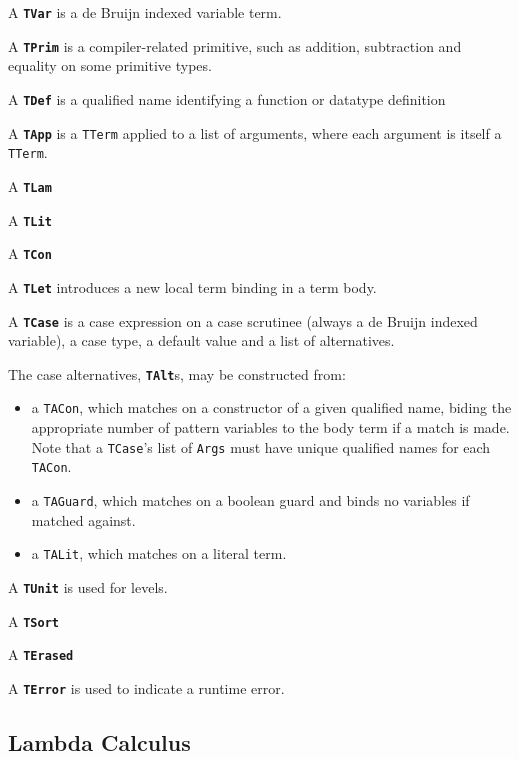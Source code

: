 
A \textbf{\lstinline{TVar}} is a de Bruijn indexed variable term.

A \textbf{\lstinline{TPrim}} is a compiler-related primitive, such as addition, subtraction and equality on some primitive types.

A \textbf{\lstinline{TDef}} is a qualified name identifying a function or datatype definition %

A \textbf{\lstinline{TApp}} is a \lstinline{TTerm} applied to a list of arguments, where each argument is itself a \lstinline{TTerm}.

A \textbf{\lstinline{TLam}} %

A \textbf{\lstinline{TLit}} %

A \textbf{\lstinline{TCon}} %

A \textbf{\lstinline{TLet}} introduces a new local term binding in a term body.           

A \textbf{\lstinline{TCase}} is a case expression on a case scrutinee (always a de Bruijn indexed variable), a case type, a default value and a list of alternatives.

The case alternatives, \textbf{\lstinline{TAlt}}s, may be constructed from:
\begin{itemize}
\item a \lstinline{TACon}, which matches on a constructor of a given qualified name, biding the appropriate number of pattern variables to the body term if a match is made. Note that a \lstinline{TCase}'s list of \lstinline{Args} must have unique qualified names for each \lstinline{TACon}.
\item a \lstinline{TAGuard}, which matches on a boolean guard and binds no variables if matched against.
\item a \lstinline{TALit}, which matches on a literal term.
\end{itemize}
          
A \textbf{\lstinline{TUnit}} is used for levels. %

A \textbf{\lstinline{TSort}}

A \textbf{\lstinline{TErased}}

A \textbf{\lstinline{TError}} is used to indicate a runtime error.

\subsection{Lambda Calculus}

